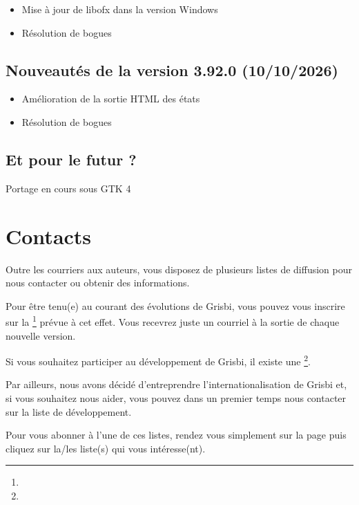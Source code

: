 \begin{itemize}
	\item Mise à jour de libofx dans la version Windows
	\item Résolution de bogues
\end{itemize}

\subsection{Nouveautés de la version 3.92.0 \textnormal{(10/10/2026)}}

\begin{itemize}
	\item Amélioration de la sortie HTML des états
	\item Résolution de bogues
\end{itemize}


\subsection{Et pour le futur ?}

Portage en cours sous \gls{GTK} 4


\section{Contacts\label{introduction-contacts}}%


Outre les courriers aux auteurs, vous disposez de plusieurs listes de diffusion pour nous contacter ou obtenir des informations.

Pour être tenu(e) au courant des évolutions de Grisbi, vous pouvez vous inscrire sur la \footnote{\urlListInfoEmail{}} prévue à cet effet. Vous recevrez juste un courriel à la sortie de chaque nouvelle version.

Si vous souhaitez participer au développement de Grisbi, il existe une \footnote{\urlListDevelEmail{}}.

Par ailleurs, nous avons décidé d'entreprendre l'internationalisation de Grisbi et, si vous souhaitez nous aider, vous pouvez dans un premier temps nous contacter sur la liste de développement.

Pour vous abonner à l'une de ces listes, rendez vous simplement sur la page \urlListDiffGrisbi{} puis cliquez sur la/les liste(s) qui vous intéresse(nt).

